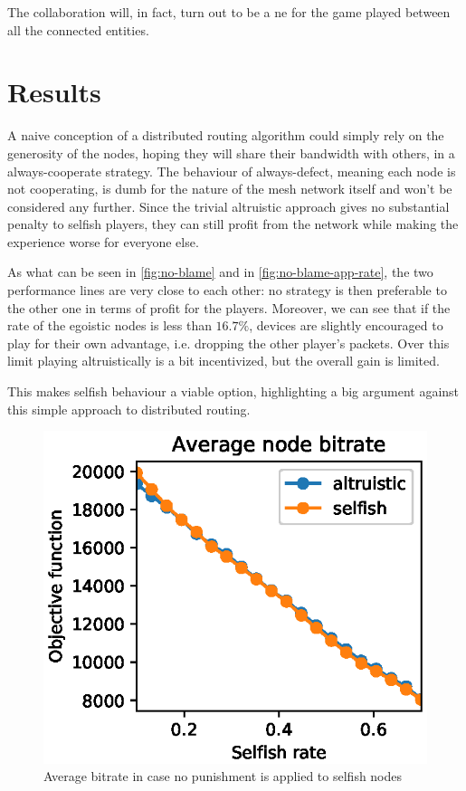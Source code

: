 \documentclass[conference,10.5pt]{IEEEtran}
\begin{document}
The collaboration will, in fact, turn out to be a \gls{ne} for the game played between all the connected entities.

\section{Results} \label{sec:results}


A naive conception of a distributed routing algorithm could simply rely on the generosity of the nodes, hoping they will share their bandwidth with others, in a always-cooperate strategy. The behaviour of always-defect, meaning each node is not cooperating, is dumb for the nature of the mesh network itself and won't be considered any further.
Since the trivial altruistic approach gives no substantial penalty to selfish players, they can still profit from the network while making the experience worse for everyone else.

As what can be seen in \autoref{fig:no-blame} and in \autoref{fig:no-blame-app-rate}, the two performance lines are very close to each other: no strategy is then  preferable to the other one in terms of profit for the players. Moreover, we can see that if the rate of the egoistic nodes is less than $16.7\%$, devices are slightly encouraged to play for their own advantage, i.e. dropping the other player's packets.
Over this limit playing altruistically is a bit incentivized, but the overall gain is limited.

This makes selfish behaviour a viable option, highlighting a big argument against this simple approach to distributed routing.

\begin{figure}[h]
  \includegraphics{figures/obj_func_vs_selfish_rate_no_punish.eps}
  \caption{Average bitrate in case no punishment is applied to selfish nodes}
  \label{fig:no-blame}
\end{figure}
\end{document}
